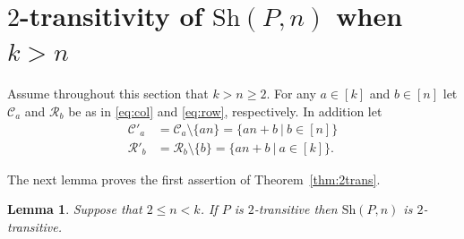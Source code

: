 \documentclass[12pt]{amsart}
\newtheorem{lem}[thm]{Lemma}
\theoremstyle{remark}
\theoremstyle{definition}
\newcommand{\sh}{\mathrm{Sh}}
\begin{document}
\section{$2$-transitivity of $\sh(P,n)$ when $k > n$} \label{sec:2trans}

Assume throughout this section that $k > n \geqslant 2$. For any $a \in [k]$ and $b \in [n]$ let $\mathcal{C}_a$ and $\mathcal{R}_b$ be as in \eqref{eq:col} and \eqref{eq:row}, respectively. In addition let
	\begin{align*}
	\mathcal{C}'_a &= \mathcal{C}_a \setminus \{an\} = \{ an + b \ | \ b \in [n] \} \\
	\mathcal{R}'_b &= \mathcal{R}_b \setminus \{b\} = \{ an + b \ | \ a \in [k] \}.
	\end{align*}

The next lemma proves the first assertion of Theorem~\ref{thm:2trans}.

\begin{lem} \label{lem: 2trans-k>n}
Suppose that $2 \leqslant n < k$. If $P$ is $2$-transitive then $\sh(P,n)$ is $2$-transitive.
\end{lem}
\end{document}
